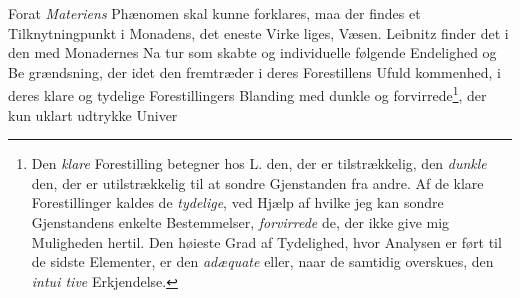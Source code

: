 \documentclass[12pt,a4paper]{book}
\begin{document}
Forat \emph{Materiens} Phænomen skal kunne forklares, maa
der findes et Tilknytningpunkt i Monadens, det eneste Virke\-%
liges, Væsen. Leibnitz finder det i den med Monadernes Na\-%
tur som skabte og individuelle følgende Endelighed og Be\-%
grændsning, der idet den fremtræder i deres Forestillens Ufuld\-%
kommenhed, i deres klare og tydelige Forestillingers Blanding
med dunkle og forvirrede\footnote{Den \emph{klare} Forestilling betegner hos L. den, der er tilstrækkelig,
den \emph{dunkle} den, der er utilstrækkelig til at sondre Gjenstanden
fra andre. Af de klare Forestillinger kaldes de \emph{tydelige}, ved
Hjælp af hvilke jeg kan sondre Gjenstandens enkelte Bestemmelser,
%
%
\emph{forvirrede} de, der ikke give mig Muligheden hertil. Den høieste
Grad af Tydelighed, hvor Analysen er ført til de sidste Elementer,
er den \emph{adæquate} eller, naar de samtidig overskues, den \emph{intui\-%
tive} Erkjendelse.}, der kun uklart udtrykke Univer\-%
\end{document}
